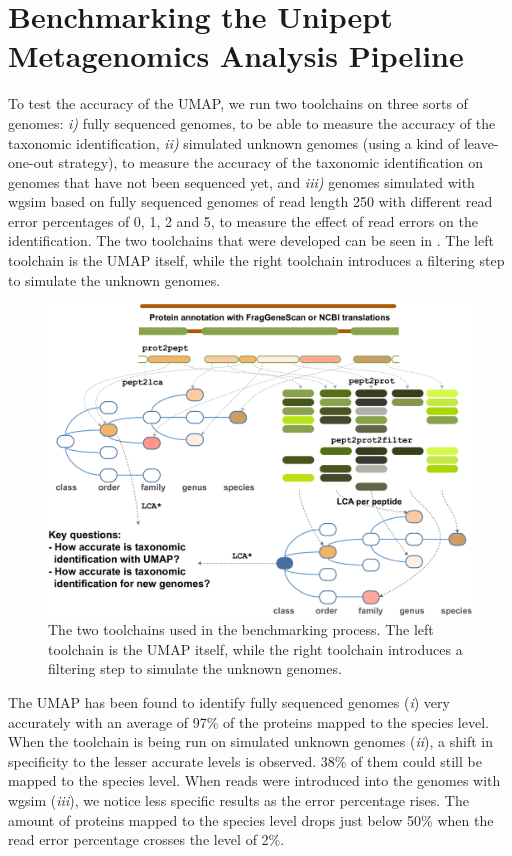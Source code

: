 \documentclass[twocolumn]{phdsymp}
\begin{document}
\section{Benchmarking the Unipept Metagenomics Analysis Pipeline} 

To test the accuracy of the UMAP, we run two toolchains on three sorts of
genomes: \textit{i)} fully sequenced genomes, to be able to measure the accuracy
of the taxonomic identification, \textit{ii)} simulated unknown genomes (using a
kind of leave-one-out strategy), to measure the accuracy of the taxonomic
identification on genomes that have not been sequenced yet, and \textit{iii)}
genomes simulated with wgsim\cite{lh3/w4:online} based on fully sequenced
genomes of read length 250 with different read error percentages of 0, 1, 2 and
5, to measure the effect of read errors on the identification. The two
toolchains that were developed can be seen in . The left
toolchain is the UMAP itself, while the right toolchain introduces a filtering
step to simulate the unknown genomes.

\begin{figure}[hbt]
	\centering 
	\includegraphics[width=\columnwidth]{includes/abstractimage.pdf}
	\caption{The two toolchains used in the benchmarking process. The left
	toolchain is the UMAP itself, while the right toolchain introduces a 
	filtering step to simulate the unknown genomes.}
	\label{fig:abstractimage}
\end{figure}

The UMAP has been found to identify fully sequenced genomes (\textit{i}) very
accurately with an average of 97\% of the proteins mapped to the species level.
When the toolchain is being run on simulated unknown genomes (\textit{ii}), a
shift in specificity to the lesser accurate levels is observed. 38\% of them
could still be mapped to the species level. When reads were introduced into the
genomes with wgsim (\textit{iii}), we notice less specific results as the error
percentage rises. The amount of proteins mapped to the species level drops just
below 50\% when the read error percentage crosses the level of 2\%.
\end{document}
